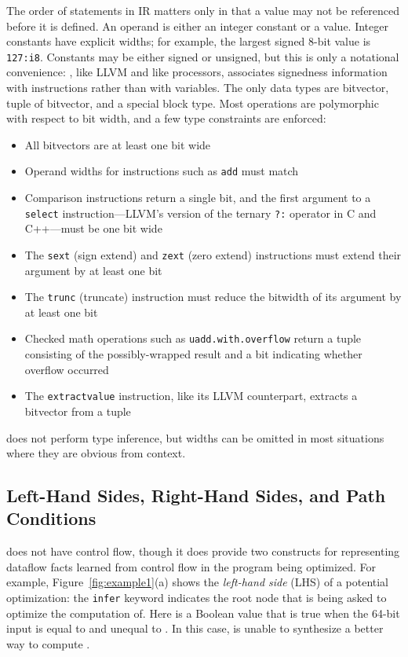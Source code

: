 The order of statements in \tool{} IR matters only in that a value
may not be referenced before it is defined.
%
An operand is either an integer constant or a value.
%
Integer constants have explicit widths; for example, the largest
signed 8-bit value is \texttt{127:i8}.
%
Constants may be either signed or unsigned, but this is only a
notational convenience: \tool{}, like LLVM and like processors,
associates signedness information with instructions rather than with
variables.
%
The only data types are bitvector, tuple of bitvector, and a special
block type.
%
Most operations are polymorphic with respect to bit width, and a few
type constraints are enforced:
%
\begin{itemize}
\item
  All bitvectors are at least one bit wide
\item
  Operand widths for instructions such as \texttt{add} must match
\item
  Comparison instructions return a single bit, and the first argument
  to a \texttt{select} instruction---LLVM's version of the ternary
  \texttt{?:} operator in C and C++---must be one bit wide
\item
  The \texttt{sext} (sign extend) and \texttt{zext} (zero extend)
  instructions must extend their argument by at least one bit
\item
  The \texttt{trunc} (truncate) instruction must reduce the bitwidth of its
  argument by at least one bit
\item
  Checked math operations such as \texttt{uadd.with.overflow} return
  a tuple consisting of the possibly-wrapped result and a bit
  indicating whether overflow occurred
\item
  The \texttt{extractvalue} instruction, like its LLVM counterpart,
  extracts a bitvector from a tuple
\end{itemize}
%
\tool{} does not perform type inference, but widths can be omitted in
most situations where they are obvious from context.


\subsection{Left-Hand Sides, Right-Hand Sides, and Path Conditions}

\tool{} does not have control flow, though it does provide two
constructs for representing dataflow facts learned from control flow
in the program being optimized.
%
%
For example, Figure~\ref{fig:example1}(a) shows the \emph{left-hand
  side} (LHS) of a potential optimization: the \texttt{infer} keyword
indicates the root node that \tool{} is being asked to optimize the
computation of.
%
Here  is a Boolean value that is true when the 64-bit input
 is equal to  and unequal to .
%
In this case, \tool{} is unable to synthesize a better way to compute
.


